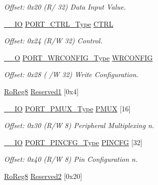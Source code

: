 \begin{DoxyCompactItemize}
\begin{DoxyCompactList}\small\item\em Offset\+: 0x20 (R/ 32) Data Input Value. \end{DoxyCompactList}\item 
\mbox{\hyperlink{core__cm0plus_8h_aec43007d9998a0a0e01faede4133d6be}{\+\_\+\+\_\+\+IO}} \mbox{\hyperlink{union_p_o_r_t___c_t_r_l___type}{P\+O\+R\+T\+\_\+\+C\+T\+R\+L\+\_\+\+Type}} \mbox{\hyperlink{struct_port_group_a43444687a8814be2e0ce096ecc188389}{C\+T\+RL}}
\begin{DoxyCompactList}\small\item\em Offset\+: 0x24 (R/W 32) Control. \end{DoxyCompactList}\item 
\mbox{\hyperlink{core__cm0plus_8h_a7e25d9380f9ef903923964322e71f2f6}{\+\_\+\+\_\+O}} \mbox{\hyperlink{union_p_o_r_t___w_r_c_o_n_f_i_g___type}{P\+O\+R\+T\+\_\+\+W\+R\+C\+O\+N\+F\+I\+G\+\_\+\+Type}} \mbox{\hyperlink{struct_port_group_a4a3b3dee5230a97dcec3017868e2f5d8}{W\+R\+C\+O\+N\+F\+IG}}
\begin{DoxyCompactList}\small\item\em Offset\+: 0x28 ( /W 32) Write Configuration. \end{DoxyCompactList}\item 
\mbox{\hyperlink{group___s_a_m_d21_e15_a__definitions_ga0d957f1433aaf5d70e4dc2b68288442d}{Ro\+Reg8}} \mbox{\hyperlink{struct_port_group_a1106a1fe7c5fa01a183c54b4b992a7f0}{Reserved1}} \mbox{[}0x4\mbox{]}
\item 
\mbox{\hyperlink{core__cm0plus_8h_aec43007d9998a0a0e01faede4133d6be}{\+\_\+\+\_\+\+IO}} \mbox{\hyperlink{union_p_o_r_t___p_m_u_x___type}{P\+O\+R\+T\+\_\+\+P\+M\+U\+X\+\_\+\+Type}} \mbox{\hyperlink{struct_port_group_a07c536dbc789ce555370ffcfe5dabb72}{P\+M\+UX}} \mbox{[}16\mbox{]}
\begin{DoxyCompactList}\small\item\em Offset\+: 0x30 (R/W 8) Peripheral Multiplexing n. \end{DoxyCompactList}\item 
\mbox{\hyperlink{core__cm0plus_8h_aec43007d9998a0a0e01faede4133d6be}{\+\_\+\+\_\+\+IO}} \mbox{\hyperlink{union_p_o_r_t___p_i_n_c_f_g___type}{P\+O\+R\+T\+\_\+\+P\+I\+N\+C\+F\+G\+\_\+\+Type}} \mbox{\hyperlink{struct_port_group_a5bf1b629002458249752057bbc90648e}{P\+I\+N\+C\+FG}} \mbox{[}32\mbox{]}
\begin{DoxyCompactList}\small\item\em Offset\+: 0x40 (R/W 8) Pin Configuration n. \end{DoxyCompactList}\item 
\mbox{\hyperlink{group___s_a_m_d21_e15_a__definitions_ga0d957f1433aaf5d70e4dc2b68288442d}{Ro\+Reg8}} \mbox{\hyperlink{struct_port_group_a1a6c9b5a2cafc18c3aa3491098ba6c2e}{Reserved2}} \mbox{[}0x20\mbox{]}
\end{DoxyCompactItemize}


